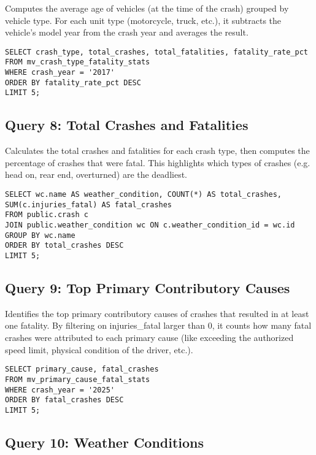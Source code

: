 \documentclass[12pt]{article}
\begin{document}
Computes the average age of vehicles (at the time of the crash) grouped by vehicle type. For each unit type (motorcycle, truck, etc.), it subtracts the vehicle’s model year from the crash year and averages the result.

{\scriptsize
\begin{verbatim}
SELECT crash_type, total_crashes, total_fatalities, fatality_rate_pct
FROM mv_crash_type_fatality_stats 
WHERE crash_year = '2017'
ORDER BY fatality_rate_pct DESC
LIMIT 5;
\end{verbatim}}


\subsection{Query 8: Total Crashes and Fatalities}

Calculates the total crashes and fatalities for each crash type, then computes the percentage of crashes that were fatal. This highlights which types of crashes (e.g. head on, rear end, overturned) are the deadliest.

{\scriptsize
\begin{verbatim}
SELECT wc.name AS weather_condition, COUNT(*) AS total_crashes, SUM(c.injuries_fatal) AS fatal_crashes
FROM public.crash c
JOIN public.weather_condition wc ON c.weather_condition_id = wc.id
GROUP BY wc.name
ORDER BY total_crashes DESC
LIMIT 5;
\end{verbatim}}


\subsection{Query 9: Top Primary Contributory Causes}

Identifies the top primary contributory causes of crashes that resulted in at least one fatality. By filtering on injuries\_fatal larger than 0, it counts how many fatal crashes were attributed to each primary cause (like exceeding the authorized speed limit, physical condition of the driver, etc.).

{\scriptsize
\begin{verbatim}
SELECT primary_cause, fatal_crashes
FROM mv_primary_cause_fatal_stats 
WHERE crash_year = '2025'
ORDER BY fatal_crashes DESC
LIMIT 5;
\end{verbatim}}



\subsection{Query 10: Weather Conditions}
\end{document}
